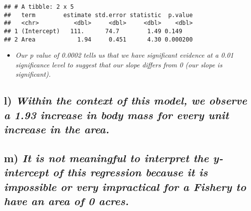\documentclass[
]{article}
\providecommand{\tightlist}{%
  \setlength{\itemsep}{0pt}\setlength{\parskip}{0pt}}
\begin{document}
\begin{verbatim}
## # A tibble: 2 x 5
##   term        estimate std.error statistic  p.value
##   <chr>          <dbl>     <dbl>     <dbl>    <dbl>
## 1 (Intercept)   111.      74.7        1.49 0.149   
## 2 Area            1.94     0.451      4.30 0.000200
\end{verbatim}

\begin{itemize}
\tightlist
\item
  \emph{Our p value of 0.0002 tells us that we have significant evidence
  at a 0.01 significance level to suggest that our slope differs from 0
  (our slope is significant).}
\end{itemize}

\hypertarget{l-within-the-context-of-this-model-we-observe-a-1.93-increase-in-body-mass-for-every-unit-increase-in-the-area.}{%
\subsection{\texorpdfstring{l) \emph{Within the context of this model,
we observe a 1.93 increase in body mass for every unit increase in the
area.}}{l) Within the context of this model, we observe a 1.93 increase in body mass for every unit increase in the area.}}\label{l-within-the-context-of-this-model-we-observe-a-1.93-increase-in-body-mass-for-every-unit-increase-in-the-area.}}

\hypertarget{m-it-is-not-meaningful-to-interpret-the-y-intercept-of-this-regression-because-it-is-impossible-or-very-impractical-for-a-fishery-to-have-an-area-of-0-acres.}{%
\subsection{\texorpdfstring{m) \emph{It is not meaningful to interpret
the y-intercept of this regression because it is impossible or very
impractical for a Fishery to have an area of 0
acres.}}{m) It is not meaningful to interpret the y-intercept of this regression because it is impossible or very impractical for a Fishery to have an area of 0 acres.}}\label{m-it-is-not-meaningful-to-interpret-the-y-intercept-of-this-regression-because-it-is-impossible-or-very-impractical-for-a-fishery-to-have-an-area-of-0-acres.}}
\end{document}
